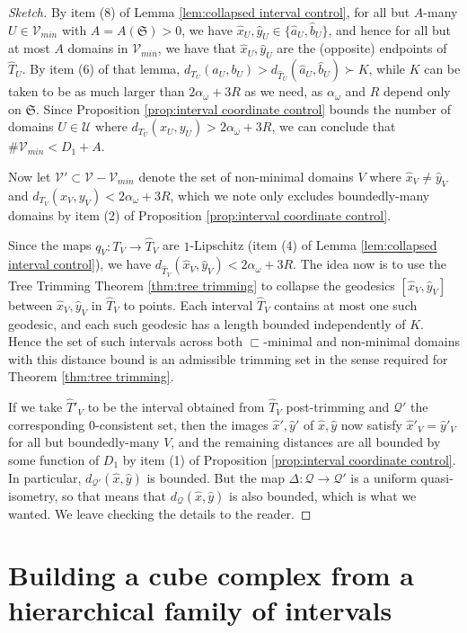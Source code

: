 \documentclass{amsart}
\theoremstyle{definition}
\theoremstyle{remark}
\theoremstyle{definition}
\newcommand{\calQ}{\mathcal{Q}}
\newcommand{\calU}{\mathcal{U}}
\newcommand{\calV}{\mathcal{V}}
\newcommand{\hT}{\widehat{T}}
\newcommand{\hx}{\hat{x}}
\newcommand{\ha}{\hat{a}}
\newcommand{\hb}{\hat{b}}
\newcommand{\hy}{\hat{y}}
\newcommand{\nest}{\sqsubset}
\begin{document}
\begin{proof}[Sketch]
By item (8) of Lemma \ref{lem:collapsed interval control}, for all but $A$-many $U \in \calV_{min}$ with $A = A(\mathfrak S)>0$, we have $\hx_U,\hy_U \in \{\ha_U,\hb_U\}$, and hence for all but at most $A$ domains in $\calV_{min}$, we have that $\hx_U,\hy_U$ are the (opposite) endpoints of $\hT_U$.  By item (6) of that lemma, $d_{T_U}(a_U,b_U) > d_{\hT_U}(\ha_U,\hb_U) \succ K$, while $K$ can be taken to be as much larger than $2\alpha_{\omega} + 3R$ as we need, as $\alpha_{\omega}$ and $R$ depend only on $\mathfrak S$.  Since Proposition \ref{prop:interval coordinate control} bounds the number of domains $U \in \calU$ where $d_{T_U}(x_U,y_U)> 2\alpha_{\omega} + 3R$, we can conclude that $\#\calV_{min} < D_1 + A$.

Now let $\calV' \subset \calV - \calV_{min}$ denote the set of non-minimal domains $V$ where $\hx_V \neq \hy_V$ and $d_{T_V}(x_V,y_V) < 2\alpha_{\omega} + 3R$, which we note only excludes boundedly-many domains by item (2) of Proposition \ref{prop:interval coordinate control}.

Since the maps $q_V:T_V \to \hT_V$ are $1$-Lipschitz (item (4) of Lemma \ref{lem:collapsed interval control}), we have $d_{\hT_V}(\hx_V,\hy_V) < 2\alpha_{\omega} + 3R$.  The idea now is to use the Tree Trimming Theorem \ref{thm:tree trimming} to collapse the geodesics $[\hx_V,\hy_V]$ between $\hx_V,\hy_V$ in $\hT_V$ to points.  Each interval $\hT_V$ contains at most one such geodesic, and each such geodesic has a length bounded independently of $K$.  Hence the set of such intervals across both $\nest$-minimal and non-minimal domains with this distance bound is an admissible trimming set in the sense required for Theorem \ref{thm:tree trimming}.

If we take $\hT'_V$ to be the interval obtained from $\hT_V$ post-trimming and $\calQ'$ the corresponding $0$-consistent set, then the images $\hx', \hy'$ of $\hx,\hy$ now satisfy $\hx'_V = \hy'_V$ for all but boundedly-many $V$, and the remaining distances are all bounded by some function of $D_1$ by item (1) of Proposition \ref{prop:interval coordinate control}.  In particular, $d_{\calQ'}(\hx,\hy)$ is bounded.  But the map $\Delta:\calQ \to \calQ'$ is a uniform quasi-isometry, so that means that $d_{\calQ}(\hx,\hy)$ is also bounded, which is what we wanted.  We leave checking the details to the reader.
\end{proof}

\section{Building a cube complex from a hierarchical family of intervals}\label{sec:cubulation}
\end{document}
